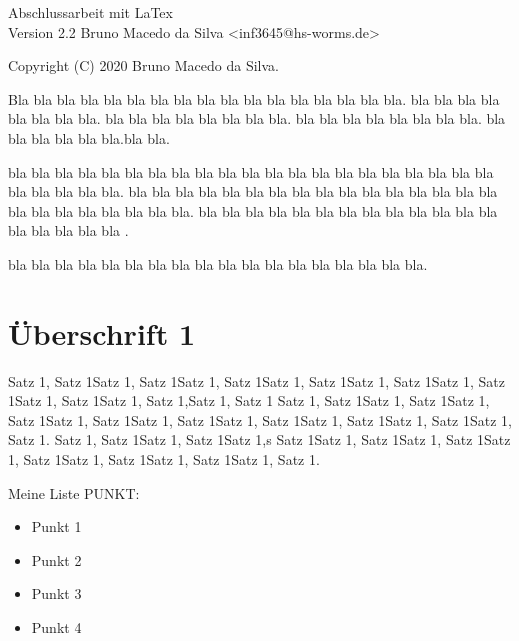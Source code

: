 




    \begin{titlepage}
        \vspace*{7cm}
        \begin{center}
            \Huge
            Abschlussarbeit mit LaTex\\
            \vspace{1cm}
            \large
            Version 2.2
            \vspace{2cm}
            Bruno Macedo da Silva <inf3645@hs-worms.de>

        \end{center}
        \normalsize
        \vfill
        Copyright (C) 2020 Bruno Macedo da Silva.

        Bla bla bla bla bla bla bla bla bla bla bla bla bla bla bla bla bla. bla bla bla bla bla bla bla bla. 
        bla bla bla bla bla bla bla bla. bla bla bla bla bla bla bla bla. bla bla bla bla bla bla.bla bla.

        bla bla bla bla bla bla bla bla bla bla bla bla bla bla bla bla bla bla bla bla bla bla bla bla bla bla.
        bla bla bla bla bla bla bla bla bla bla bla bla bla bla bla bla bla bla bla bla bla bla bla bla.
        bla bla bla bla bla bla bla bla bla bla bla bla bla bla bla bla bla bla .


        bla bla bla bla bla bla bla bla bla bla bla bla bla bla bla bla bla bla.


    \end{titlepage}

    
    
    \tableofcontents
    \listoffigures
    \listoftables

    \section{Überschrift 1}

    Satz 1, Satz 1Satz 1, Satz 1Satz 1, Satz 1Satz 1, Satz 1Satz 1, Satz 1Satz 1, Satz 1Satz 1, Satz 1Satz 1, Satz 1,Satz 1, Satz 1
    Satz 1, Satz 1Satz 1, Satz 1Satz 1, Satz 1Satz 1, Satz 1Satz 1, Satz 1Satz 1, Satz 1Satz 1, Satz 1Satz 1, Satz 1Satz 1, Satz 1.
    Satz 1, Satz 1Satz 1, Satz 1Satz 1,s Satz 1Satz 1, Satz 1Satz 1, Satz 1Satz 1, Satz 1Satz 1, Satz 1Satz 1, Satz 1Satz 1, Satz 1.

    Meine Liste PUNKT:
    \begin{itemize}
        \item Punkt 1
        \item Punkt 2
        \item Punkt 3
        \item Punkt 4
    \end{itemize}

